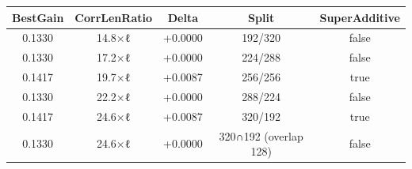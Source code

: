 \begin{table}[h]
\centering
\begin{tabular}{ |c|c|c|c|c| }
\hline
BestGain & CorrLenRatio & Delta & Split & SuperAdditive \\
\hline
0.1330 & 14.8×ℓ & +0.0000 & 192/320 & false \\
\hline
0.1330 & 17.2×ℓ & +0.0000 & 224/288 & false \\
\hline
0.1417 & 19.7×ℓ & +0.0087 & 256/256 & true \\
\hline
0.1330 & 22.2×ℓ & +0.0000 & 288/224 & false \\
\hline
0.1417 & 24.6×ℓ & +0.0087 & 320/192 & true \\
\hline
0.1330 & 24.6×ℓ & +0.0000 & 320∩192 (overlap 128) & false \\
\hline
\end{tabular}
\end{table}
